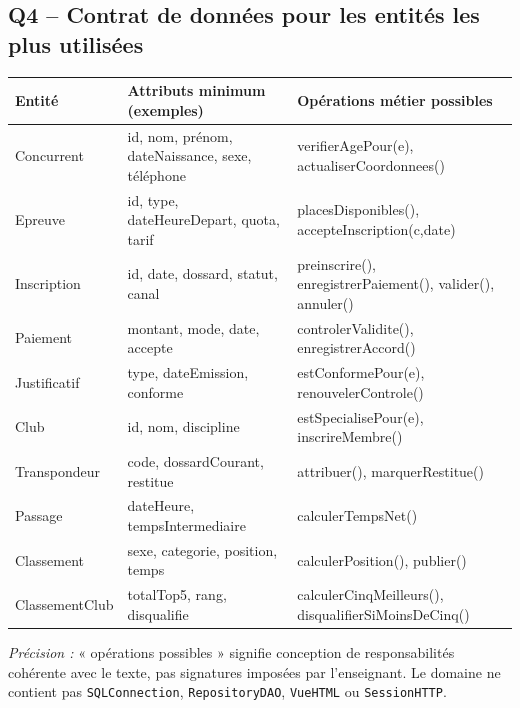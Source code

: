 \documentclass[10pt,a4paper]{article}
\begin{document}
\subsection{Q4 -- Contrat de données pour les entités les plus utilisées}
\small\begin{longtable}{@{}p{29mm}p{63mm}p{61mm}@{}}\toprule
Entité & Attributs minimum (exemples) & Opérations métier possibles \\ \midrule\endhead
Concurrent & id, nom, prénom, dateNaissance, sexe, téléphone & verifierAgePour(e), actualiserCoordonnees()\\
Epreuve & id, type, dateHeureDepart, quota, tarif & placesDisponibles(), accepteInscription(c,date)\\
Inscription & id, date, dossard, statut, canal & preinscrire(), enregistrerPaiement(), valider(), annuler()\\
Paiement & montant, mode, date, accepte & controlerValidite(), enregistrerAccord()\\
Justificatif & type, dateEmission, conforme & estConformePour(e), renouvelerControle()\\
Club & id, nom, discipline & estSpecialisePour(e), inscrireMembre()\\
Transpondeur & code, dossardCourant, restitue & attribuer(), marquerRestitue()\\
Passage & dateHeure, tempsIntermediaire & calculerTempsNet()\\
Classement & sexe, categorie, position, temps & calculerPosition(), publier()\\
ClassementClub & totalTop5, rang, disqualifie & calculerCinqMeilleurs(), disqualifierSiMoinsDeCinq()\\
\bottomrule\end{longtable}\normalsize
\textit{Précision :} « opérations possibles » signifie conception de responsabilités cohérente avec le texte, pas signatures imposées par l'enseignant. Le domaine ne contient pas \texttt{SQLConnection}, \texttt{RepositoryDAO}, \texttt{VueHTML} ou \texttt{SessionHTTP}.
\medskip
\end{document}
